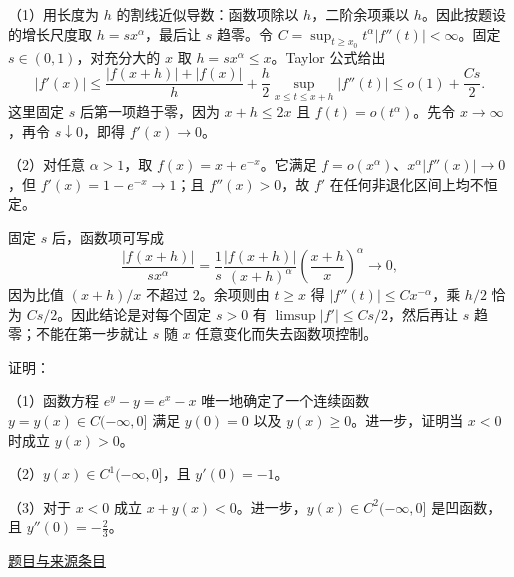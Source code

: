 \documentclass[12pt,fontset=fandol]{ctexart}
\begin{document}
\begin{solve}\label{ans:fin13-high:7}

（1）用长度为 $h$ 的割线近似导数：函数项除以 $h$，二阶余项乘以 $h$。因此按题设的增长尺度取 $h=sx^\alpha$，最后让 $s$ 趋零。令 $C=\sup_{t\ge x_0}t^\alpha|f''(t)|<\infty$。固定 $s\in(0,1)$，对充分大的 $x$ 取 $h=sx^\alpha\le x$。Taylor 公式给出
\[
|f'(x)|\le\frac{|f(x+h)|+|f(x)|}{h}
       +\frac h2\sup_{x\le t\le x+h}|f''(t)|
\le o(1)+\frac{Cs}{2}.
\]
这里固定 $s$ 后第一项趋于零，因为 $x+h\le2x$ 且 $f(t)=o(t^\alpha)$。先令 $x\to\infty$，再令 $s\downarrow0$，即得 $f'(x)\to0$。

（2）对任意 $\alpha>1$，取 $f(x)=x+e^{-x}$。它满足 $f=o(x^\alpha)$、$x^\alpha|f''(x)|\to0$，但 $f'(x)=1-e^{-x}\to1$；且 $f''(x)>0$，故 $f'$ 在任何非退化区间上均不恒定。

固定 $s$ 后，函数项可写成
\[
\frac{|f(x+h)|}{sx^\alpha}
=\frac1s\frac{|f(x+h)|}{(x+h)^\alpha}\left(\frac{x+h}{x}\right)^\alpha\to0,
\]
因为比值 $(x+h)/x$ 不超过 $2$。余项则由 $t\ge x$ 得 $|f''(t)|\le Cx^{-\alpha}$，乘 $h/2$ 恰为 $Cs/2$。因此结论是对每个固定 $s>0$ 有 $\limsup|f'|\le Cs/2$，然后再让 $s$ 趋零；不能在第一步就让 $s$ 随 $x$ 任意变化而失去函数项控制。

\end{solve}

\begin{example}\label{ex:fin13-low:9}\label{pr:fin13-low:9}

证明：

（1）函数方程 $e^{y} - y = e^{x} - x$ 唯一地确定了一个连续函数 $y = y(x) \in C(-\infty, 0]$ 满足 $y(0) = 0$ 以及 $y(x) \geq 0$。进一步，证明当 $x < 0$ 时成立 $y(x) > 0$。

（2）$y(x) \in C^{1}(-\infty, 0]$，且 $y'(0) = -1$。

（3）对于 $x < 0$ 成立 $x + y(x) < 0$。进一步，$y(x) \in C^{2}(-\infty, 0]$ 是凹函数，且 $y''(0) = -\frac{2}{3}$。

\par\href{https://github.com/lzxcr/cmc-mathematics/blob/64916fa1fdbc3e444a652eca204d5669058ee321/src/problems/finals/13/10.md}{题目与来源条目}

\end{example}
\end{document}
